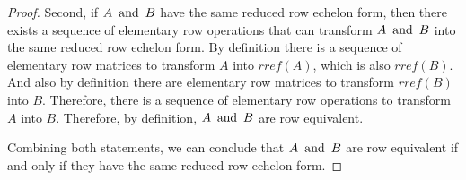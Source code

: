 \documentclass{article}
\begin{document}
\begin{enumerate}
{\begin{proof}
      Second, if $A \operatorname{~\text{and}~} B$ have the same reduced row echelon form, then there exists a sequence of elementary row operations that can transform $A \operatorname{~\text{and}~} B$ into the same reduced row echelon form. By definition there is a sequence of elementary row matrices to transform $A$ into $rref(A)$, which is also $rref(B)$. And also by definition there are elementary row matrices to transform $rref(B)$ into $B$. Therefore, there is a sequence of elementary row operations to transform $A$ into $B$. Therefore, by definition, $A \operatorname{~\text{and}~} B$ are row equivalent.

      Combining both statements, we can conclude that $A \operatorname{~\text{and}~} B$ are row equivalent if and only if they have the same reduced row echelon form.
    \end{proof}
  }
\end{enumerate}
\end{document}
